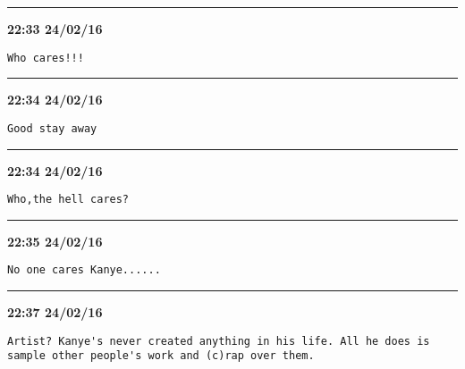 \hrule%

\begin{adjustwidth}{0cm}{0cm}
\footnotesize \textbf{22:33 24/02/16}

\begin{lstlisting}[breaklines, breakatwhitespace, basicstyle=\small, frame=leftline]
Who cares!!!
\end{lstlisting}
\end{adjustwidth}

\hrule%

\begin{adjustwidth}{0cm}{0cm}
\footnotesize \textbf{22:34 24/02/16}

\begin{lstlisting}[breaklines, breakatwhitespace, basicstyle=\small, frame=leftline]
Good stay away
\end{lstlisting}
\end{adjustwidth}

\hrule%

\begin{adjustwidth}{0cm}{0cm}
\footnotesize \textbf{22:34 24/02/16}

\begin{lstlisting}[breaklines, breakatwhitespace, basicstyle=\small, frame=leftline]
Who,the hell cares?
\end{lstlisting}
\end{adjustwidth}

\hrule%

\begin{adjustwidth}{0cm}{0cm}
\footnotesize \textbf{22:35 24/02/16}

\begin{lstlisting}[breaklines, breakatwhitespace, basicstyle=\small, frame=leftline]
No one cares Kanye......
\end{lstlisting}
\end{adjustwidth}

\hrule%

\begin{adjustwidth}{0cm}{0cm}
\footnotesize \textbf{22:37 24/02/16}

\begin{lstlisting}[breaklines, breakatwhitespace, basicstyle=\small, frame=leftline]
Artist? Kanye's never created anything in his life. All he does is sample other people's work and (c)rap over them.
\end{lstlisting}
\end{adjustwidth}

